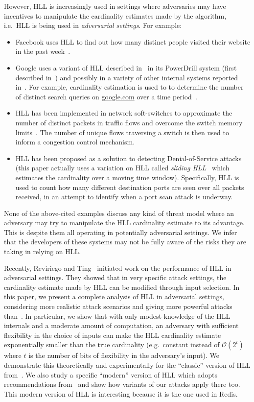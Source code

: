 \documentclass[sigconf, anonymous, dvipsnames]{acmart} %
\begin{document}
However, HLL is increasingly used in settings where adversaries may have incentives to manipulate the cardinality estimates made by the algorithm, i.e.\ HLL is being used in \emph{adversarial settings}. For example:
\begin{itemize}
    \item Facebook uses HLL to find out how many distinct people visited their website in the past week~\cite{fbhll}.
    \item Google uses a variant of HLL described in~\cite{hllpractice} in its PowerDrill system (first described in~\cite{HallBBGN12}) and possibly in a variety of other internal systems reported in~\cite{hllpractice}. For example, cardinality estimation is used to to determine the number of distinct search queries on \url{google.com} over a time period~\cite{hllpractice}. %
    \item HLL has been implemented in network soft-switches to approximate the number of distinct packets in traffic flows and overcome the switch memory limits~\cite{flexswitch}. The number of unique flows traversing a switch is then used to  inform a congestion control mechanism.
    \item HLL has been proposed as a solution to detecting Denial-of-Service attacks~\cite{portscanhll} (this paper actually uses a variation on HLL called \emph{sliding HLL}~\cite{slidinghll} which estimates the cardinality over a moving time window). Specifically, HLL is used to count how many different destination ports are seen over all packets received, in an attempt to identify when a port scan attack is underway.
\end{itemize}

None of the above-cited examples discuss any kind of threat model where an adversary may try to manipulate the HLL cardinality estimate to its advantage. This is despite them all operating in potentially adversarial settings. We infer that the developers of these systems may not be fully aware of the risks they are taking in relying on HLL.

Recently, Reviriego and Ting~\cite{hllvuln} initiated work on the performance of HLL in adversarial settings. They showed that in very specific attack settings, the cardinality estimate made by HLL can be modified through input selection. In this paper, we present a complete analysis of HLL in adversarial settings, considering more realistic attack scenarios and giving more powerful attacks than~\cite{hllvuln}. In particular, we show that with only modest knowledge of the HLL internals and a moderate amount of computation, an adversary with sufficient flexibility in the choice of inputs can make the HLL cardinality estimate exponentially smaller than the true cardinality (e.g.\ constant instead of ${\mathcal{O}}(2^t)$ where $t$ is the number of bits of flexibility in the adversary's input). We demonstrate this theoretically and experimentally for the ``classic'' version of HLL from~\cite{hll}. We also study a specific ``modern'' version of HLL which adopts recommendations from~\cite{hllnew} and show how variants of our attacks apply there too. This modern version of HLL is interesting because it is the one used in Redis.
\end{document}
